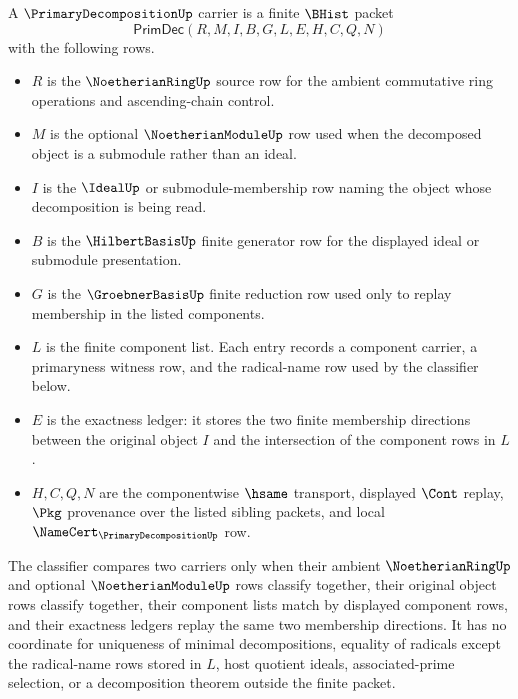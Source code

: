 \begin{definition}\label{def:primary-decomposition-carrier}
A $\PrimaryDecompositionUp$ carrier is a finite $\BHist$ packet
$$
\mathsf{PrimDec}(R,M,I,B,G,L,E,H,C,Q,N)
$$
with the following rows.
\begin{itemize}
\item $R$ is the $\NoetherianRingUp$ source row for the ambient commutative ring operations and ascending-chain control.
\item $M$ is the optional $\NoetherianModuleUp$ row used when the decomposed object is a submodule rather than an ideal.
\item $I$ is the $\IdealUp$ or submodule-membership row naming the object whose decomposition is being read.
\item $B$ is the $\HilbertBasisUp$ finite generator row for the displayed ideal or submodule presentation.
\item $G$ is the $\GroebnerBasisUp$ finite reduction row used only to replay membership in the listed components.
\item $L$ is the finite component list. Each entry records a component carrier, a primaryness witness row, and the radical-name row used by the classifier below.
\item $E$ is the exactness ledger: it stores the two finite membership directions between the original object $I$ and the intersection of the component rows in $L$.
\item $H,C,Q,N$ are the componentwise $\hsame$ transport, displayed $\Cont$ replay, $\Pkg$ provenance over the listed sibling packets, and local $\NameCert_{\PrimaryDecompositionUp}$ row.
\end{itemize}
The classifier compares two carriers only when their ambient $\NoetherianRingUp$ and optional $\NoetherianModuleUp$ rows classify together, their original object rows classify together, their component lists match by displayed component rows, and their exactness ledgers replay the same two membership directions. It has no coordinate for uniqueness of minimal decompositions, equality of radicals except the radical-name rows stored in $L$, host quotient ideals, associated-prime selection, or a decomposition theorem outside the finite packet.
\end{definition}

